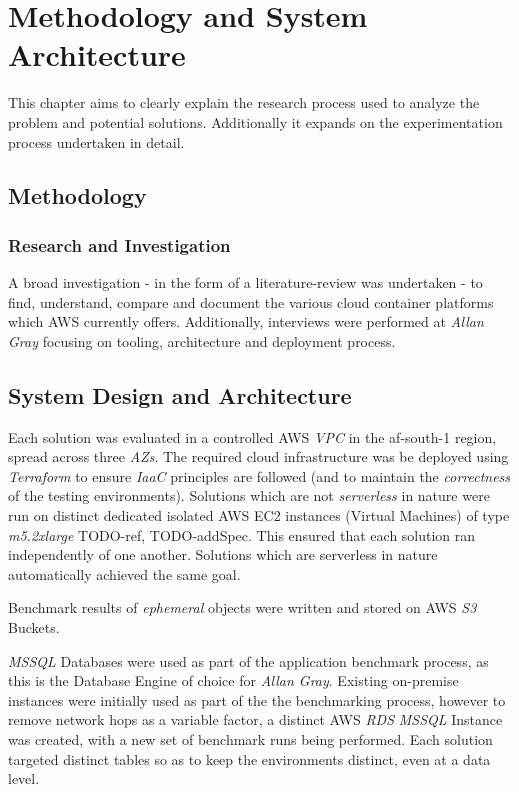 \part{Methodology and System Architecture}

This chapter aims to clearly explain the research process used to analyze the problem and potential solutions.
Additionally it expands on the experimentation process undertaken in detail.

\chapter{Methodology}

\section{Research and Investigation}

A broad investigation - in the form of a literature-review was undertaken - to find, understand, compare and document the various cloud container platforms which AWS currently offers.
Additionally, interviews were performed at \emph{Allan Gray} focusing on tooling, architecture and deployment process.

\chapter{System Design and Architecture}

Each solution was evaluated in a controlled AWS \emph{VPC} in the af-south-1 region, spread across three \emph{AZs}.
The required cloud infrastructure was be deployed using \emph{Terraform} to ensure \emph{IaaC} principles are followed (and to maintain the \emph{correctness} of the testing environments).
Solutions which are not \emph{serverless} in nature were run on distinct dedicated isolated AWS EC2 instances (Virtual Machines) of type \emph{m5.2xlarge} TODO-ref, TODO-addSpec. This ensured that each solution ran independently of one another.
Solutions which are serverless in nature automatically achieved the same goal.

Benchmark results of \emph{ephemeral} objects were written and stored on AWS \emph{S3} Buckets.

\emph{MSSQL} Databases were used as part of the application benchmark process, as this is the Database Engine of choice for \emph{Allan Gray}.
Existing on-premise instances were initially used as part of the the benchmarking process, however to remove network hops as a variable factor,
a distinct AWS \emph{RDS} \emph{MSSQL} Instance was created, with a new set of benchmark runs being performed.
Each solution targeted distinct tables so as to keep the environments distinct, even at a data level.

